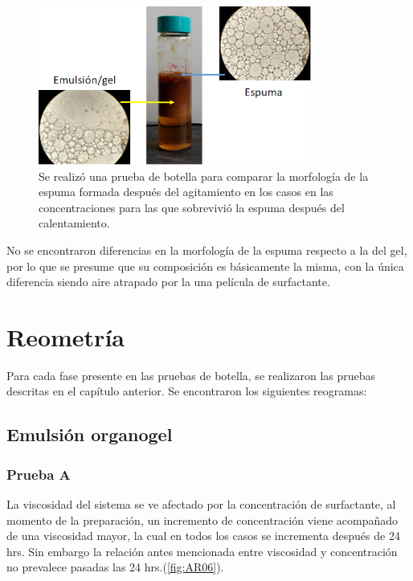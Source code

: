 \begin{figure}[H]\centering 
    \includegraphics[width=0.8\textwidth]{Experimental/comparativa.png}
    \caption[Morfología de espuma]{Se realizó una prueba de botella para comparar la morfología de la espuma formada después del agitamiento en los casos en las concentraciones para las que sobrevivió la espuma después del calentamiento. }
    \label{fig:comparativa}
\end{figure}

No se encontraron diferencias en la morfología de la espuma respecto a la del gel, por lo que se presume que su composición es básicamente la misma, con la única diferencia siendo aire atrapado por la una película de surfactante.

\section{Reometría}
Para cada fase presente en las pruebas de botella, se realizaron las pruebas descritas en el capítulo anterior. Se encontraron los siguientes reogramas:

\subsection{Emulsión organogel}

    \subsubsection{Prueba A}
    La viscosidad del sistema se ve afectado por la concentración de surfactante, al momento de la preparación, un incremento de concentración viene acompañado de una viscosidad mayor, la cual en todos los casos se incrementa después de 24 hrs. Sin embargo la relación antes mencionada entre viscosidad y concentración no prevalece pasadas las 24 hrs.(\autoref{fig:AR06}).
    
